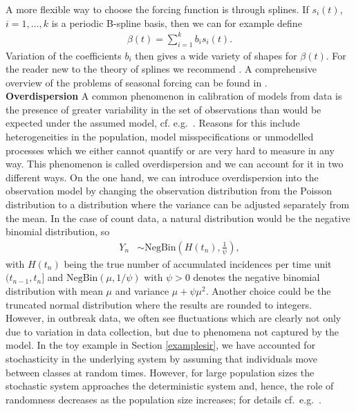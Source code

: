 A more flexible way to choose the forcing function is through splines. If $s_i(t)$, $i = 1,\dots, k$ is a periodic B-spline basis,  then
we can for example define
\begin{align*}
\beta(t)= \sum_{i=1}^k b_i s_i(t).
\end{align*}
Variation of the coefficients $b_i$ then gives a wide variety of shapes for $\beta(t)$. For the reader new to the theory of splines we recommend \cite{Stoer2002}. A comprehensive overview of the problems of seasonal forcing can be found in \cite{kee}.\\
\newline
\textbf{Overdispersion} A common phenomenon in calibration of models from data is the  presence of greater variability in the  set of observations  than would be expected  under the assumed model, cf. e.g.\ \cite{McCullagh1989, breto}. Reasons for this include  heterogeneities in the population, model misspecifications or unmodelled processes which we either cannot quantify or are very hard to measure in any way. 
This phenomenon is called overdispersion and we can account for it in two different ways.  On the one hand,  we can introduce overdispersion into the observation model
by changing the observation distribution from the Poisson distribution  to a distribution where  the variance can be adjusted separately from the mean. In the case of count data, a natural distribution would be the negative binomial distribution, so 
\begin{align}
Y_n &\sim \text{NegBin}\left( H(t_n), \frac{1}{\psi}\right),
\label{nbin}
\end{align}
with  $H(t_n)$ being the true number of   accumulated incidences per time unit  $(t_{n-1},t_{n}]$  and $\text{NegBin}(\mu,1/\psi) $ with $ \psi>0$  denotes the negative binomial distribution with mean $\mu$ and variance $\mu+\psi\mu^2$. 
Another  choice could be the truncated normal distribution where the results are  rounded  to integers. \\
However, in outbreak data, we often see fluctuations which  are clearly not only due to variation in data collection,  but due to phenomena not captured by the model. 
In the toy example in Section \ref{examplesir}, we have accounted for stochasticity in the underlying system by assuming that individuals move between classes at random times. However, for large population sizes  the stochastic system approaches the deterministic system  and, hence, the role of randomness decreases as the population size increases; for details cf.\ e.g.\ \cite{dar}. 
